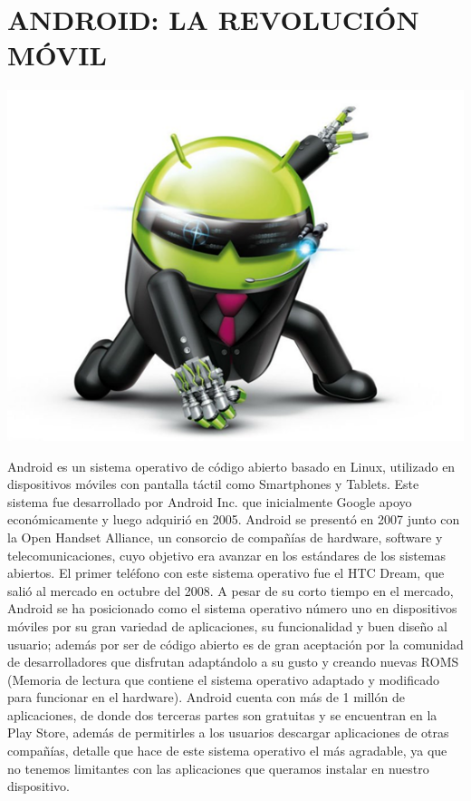 \chapter*{ANDROID: LA REVOLUCIÓN MÓVIL}

\includegraphics[scale=0.5]{img/cp05/img0501.png}

Android es un sistema operativo de código abierto basado en Linux, utilizado en dispositivos móviles con pantalla táctil como Smartphones y Tablets. Este sistema fue desarrollado 
por Android Inc. que inicialmente Google apoyo económicamente y luego adquirió en 2005. Android se presentó en 2007 junto con la Open Handset Alliance, un consorcio de compañías 
de hardware, software y telecomunicaciones, cuyo objetivo era avanzar en los estándares de los sistemas abiertos. El primer teléfono con este sistema operativo fue el HTC Dream, 
que salió al mercado en octubre del 2008. A pesar de su corto tiempo en el mercado, Android se ha posicionado como el sistema operativo número uno en dispositivos móviles por su 
gran variedad de aplicaciones, su funcionalidad y buen diseño al usuario; además por ser de código abierto es de gran aceptación por la comunidad de desarrolladores que disfrutan 
adaptándolo a su gusto y creando nuevas ROMS (Memoria de lectura que contiene el sistema operativo adaptado y modificado para funcionar en el hardware). Android cuenta con más de 
1 millón de aplicaciones, de donde dos terceras partes son gratuitas y se encuentran en la Play Store, además de permitirles a los usuarios descargar aplicaciones de otras 
compañías, detalle que hace de este sistema operativo el más agradable, ya que no tenemos limitantes con las aplicaciones que queramos instalar en nuestro dispositivo.


